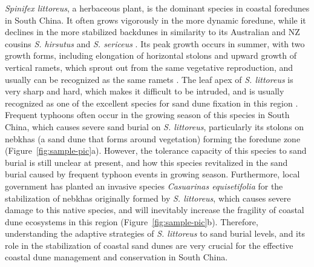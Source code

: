\documentclass[]{interact}
\theoremstyle{plain}%
\theoremstyle{definition}
\theoremstyle{remark}
\begin{document}
\label{Introduction-4}
\textit{Spinifex littoreus}, a herbaceous plant, is the dominant species in coastal foredunes in South China. It often grows vigorously in the more dynamic foredune, while it declines in the more stabilized backdunes in similarity to its Australian and NZ cousins \textit{S. hirsutus} and \textit{S. sericeus} \citep{hespReviewBiologicalGeomorphological1989}. Its peak growth occurs in summer, with two growth forms, including elongation of horizontal stolons and upward growth of vertical ramets, which sprout out from the same vegetative reproduction, and usually can be recognized as the same ramets \citep{jacksonPopulationBiologyEvolution1985}. The leaf apex of \textit{S. littoreus} is very sharp and hard, which makes it difficult to be intruded, and is usually recognized as one of the excellent species for sand dune fixation in this region \citep{yangDiurnalvariationcharacteristics2017}. Frequent typhoons often occur in the growing season of this species in South China, which causes severe sand burial on \textit{S. littoreus}, particularly its stolons on nebkhas (a sand dune that forms around vegetation) forming the foredune zone \citep{yangDiurnalvariationcharacteristics2017}(Figure~\ref{fig:sample-pic}a). However, the tolerance capacity of this species to sand burial is still unclear at present, and how this species revitalized in the sand burial caused by frequent typhoon events in growing season. Furthermore, local government has planted an invasive species \textit{Casuarinas equisetifolia} for the stabilization of nebkhas originally formed by \textit{S. littoreus}, which causes severe damage to this native species, and will inevitably increase the fragility of coastal dune ecosystems in this region (Figure~\ref{fig:sample-pic}b). Therefore, understanding the adaptive strategies of \textit{S. littoreus} to sand burial levels, and its role in the stabilization of coastal sand dunes are very crucial for the effective coastal dune management and conservation in South China. 
\end{document}
